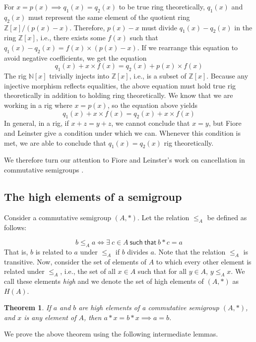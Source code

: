 \documentclass{msthesis}
\newtheorem{theorem}{Theorem}[section]
\theoremstyle{definition}
\newcommand{\ints}{\mathbb{Z}}
\newcommand{\nat}{\mathbb{N}}
\begin{document}
For $x = p(x) \implies q_1(x) = q_2(x)$ to be true ring theoretically, $q_1(x)$ and $q_2(x)$ must represent the same element of the quotient ring $\mathbb{Z}[x]/(p(x) - x)$.  Therefore, $p(x) - x$ must divide $q_1(x) - q_2(x)$ in the ring $\mathbb{Z}[x]$, i.e., there exists some $f(x)$ such that $q_1(x) - q_2(x) = f(x) \times (p(x) - x)$.  If we rearrange this equation to avoid negative coefficients, we get the equation 
\[q_1(x) + x\times f(x) = q_2(x) + p(x)\times f(x)\]
The rig $\nat[x]$ trivially injects into $\ints[x]$, i.e., is a subset of $\ints[x]$. Because any injective morphism reflects equalities, the above equation must hold true rig theoretically in addition to holding ring theoretically.  We know that we are working in a rig where $x = p(x)$, so the equation above yields 
\[ q_1(x) + x\times f(x) = q_2(x) + x\times f(x)\]
In general, in a rig, if $x + z = y + z$, we cannot conclude that $x = y$, but Fiore and Leinster give a condition under which we can. 
Whenever this condition is met, we are able to conclude that $q_1(x) = q_2(x)$ rig theoretically.

We therefore turn our attention to Fiore and Leinster's work on cancellation in commutative semigroups \cite{Fiore2005}.

\subsection{The high elements of a semigroup}\label{subsubsection:highelements}

Consider a commutative semigroup $(A, *)$.  Let the relation $\le_A$ be defined as follows:

\[ b \le_A a \iff \exists\ c \in A\ \mathsf{such\ that}\ b * c = a \]
That is, $b$ is related to $a$ under $\le_A$ if $b$ divides $a$.  Note that the relation $\le_A$ is transitive. Now, consider the set of elements of $A$ to which every other element is related under $\le_A$, i.e., the set of all $x \in A$ such that for all $y \in A$, $y \le_A x$.  We call these elements \textit{high} and we denote the set of high elements of $(A, *)$ as $H(A)$.

\begin{theorem}\label{theorem:cancellation}
    If $a$ and $b$ are high elements of a commutative semigroup $(A, *)$, and $x$ is any element of $A$, then $a * x = b * x \implies a = b$. 
\end{theorem}

We prove the above theorem using the following intermediate lemmas.
\end{document}
